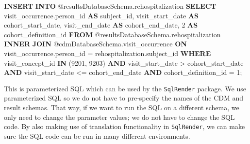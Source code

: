\documentclass[]{article}
\newenvironment{Shaded}{\begin{snugshade}}{\end{snugshade}}
\newcommand{\KeywordTok}[1]{\textcolor[rgb]{0.13,0.29,0.53}{\textbf{#1}}}
\newcommand{\DataTypeTok}[1]{\textcolor[rgb]{0.13,0.29,0.53}{#1}}
\newcommand{\DecValTok}[1]{\textcolor[rgb]{0.00,0.00,0.81}{#1}}
\newcommand{\StringTok}[1]{\textcolor[rgb]{0.31,0.60,0.02}{#1}}
\newcommand{\OperatorTok}[1]{\textcolor[rgb]{0.81,0.36,0.00}{\textbf{#1}}}
\newcommand{\NormalTok}[1]{#1}
\begin{document}
\begin{Shaded}
\begin{Highlighting}[]
\KeywordTok{INSERT} \KeywordTok{INTO}\NormalTok{ @resultsDatabaseSchema.rehospitalization}
\KeywordTok{SELECT}\NormalTok{ visit_occurrence.person_id }\KeywordTok{AS}\NormalTok{ subject_id,}
\NormalTok{visit_start_date }\KeywordTok{AS}\NormalTok{ cohort_start_date,}
\NormalTok{visit_end_date }\KeywordTok{AS}\NormalTok{ cohort_end_date,}
\DecValTok{2} \KeywordTok{AS}\NormalTok{ cohort_definition_id}
\KeywordTok{FROM}\NormalTok{ @resultsDatabaseSchema.rehospitalization}
\KeywordTok{INNER} \KeywordTok{JOIN}\NormalTok{ @cdmDatabaseSchema.visit_occurrence}
\KeywordTok{ON}\NormalTok{ visit_occurrence.person_id = rehospitalization.subject_id}
\KeywordTok{WHERE}\NormalTok{ visit_concept_id }\KeywordTok{IN}\NormalTok{ (}\DecValTok{9201}\NormalTok{, }\DecValTok{9203}\NormalTok{)}
\KeywordTok{AND}\NormalTok{ visit_start_date > cohort_start_date}
\KeywordTok{AND}\NormalTok{ visit_start_date <= cohort_end_date}
\KeywordTok{AND}\NormalTok{ cohort_definition_id = }\DecValTok{1}\NormalTok{;}
\end{Highlighting}
\end{Shaded}

This is parameterized SQL which can be used by the \texttt{SqlRender}
package. We use parameterized SQL so we do not have to pre-specify the
names of the CDM and result schemas. That way, if we want to run the SQL
on a different schema, we only need to change the parameter values; we
do not have to change the SQL code. By also making use of translation
functionality in \texttt{SqlRender}, we can make sure the SQL code can
be run in many different environments.

\begin{Shaded}
\end{Shaded}
\end{document}
